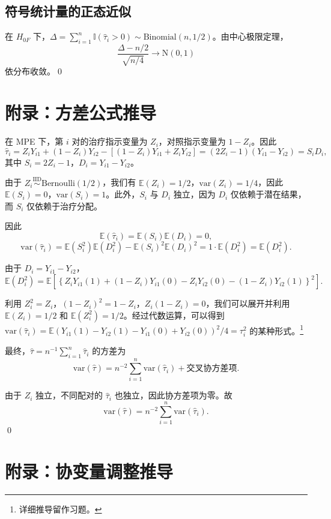\subsection{符号统计量的正态近似}\label{sec:appendix-7-sign}

在 $H_{0F}$ 下，$\Delta = \sum_{i=1}^n \mathbb{I}(\hat\tau_i > 0) \sim \text{Binomial}(n, 1/2)$。由中心极限定理，
\[
\frac{\Delta - n/2}{\sqrt{n/4}} \to \mathrm{N}(0, 1)
\]
依分布收敛。\qed

\section{附录：方差公式推导}\label{sec:appendix-7-variance}

在 MPE 下，第 $i$ 对的治疗指示变量为 $Z_i$，对照指示变量为 $1 - Z_i$。因此
\[
\hat\tau_i = Z_i Y_{i1} + (1 - Z_i) Y_{i2} - \left[(1 - Z_i) Y_{i1} + Z_i Y_{i2}\right] = (2Z_i - 1)(Y_{i1} - Y_{i2}) = S_i D_i,
\]
其中 $S_i = 2Z_i - 1$，$D_i = Y_{i1} - Y_{i2}$。

由于 $Z_i \stackrel{\text{IID}}{\sim} \text{Bernoulli}(1/2)$，我们有 $\mathbb{E}(Z_i) = 1/2$，$\text{var}(Z_i) = 1/4$，因此 $\mathbb{E}(S_i) = 0$，$\text{var}(S_i) = 1$。此外，$S_i$ 与 $D_i$ 独立，因为 $D_i$ 仅依赖于潜在结果，而 $S_i$ 仅依赖于治疗分配。

因此
\[
\mathbb{E}(\hat\tau_i) = \mathbb{E}(S_i) \mathbb{E}(D_i) = 0,
\]
\[
\text{var}(\hat\tau_i) = \mathbb{E}(S_i^2) \mathbb{E}(D_i^2) - \mathbb{E}(S_i)^2 \mathbb{E}(D_i)^2 = 1 \cdot \mathbb{E}(D_i^2) = \mathbb{E}(D_i^2).
\]

由于 $D_i = Y_{i1} - Y_{i2}$，
\[
\mathbb{E}(D_i^2) = \mathbb{E}\left[\left\{Z_i Y_{i1}(1) + (1 - Z_i) Y_{i1}(0) - Z_i Y_{i2}(0) - (1 - Z_i) Y_{i2}(1)\right\}^2\right].
\]

利用 $Z_i^2 = Z_i$，$(1 - Z_i)^2 = 1 - Z_i$，$Z_i(1 - Z_i) = 0$，我们可以展开并利用 $\mathbb{E}(Z_i) = 1/2$ 和 $\mathbb{E}(Z_i^2) = 1/2$。经过代数运算，可以得到 $\text{var}(\hat\tau_i) = \mathbb{E}(Y_{i1}(1) - Y_{i2}(1) - Y_{i1}(0) + Y_{i2}(0))^2 / 4 = \tau_i^2$ 的某种形式。\footnote{详细推导留作习题。}

最终，$\hat\tau = n^{-1} \sum_{i=1}^n \hat\tau_i$ 的方差为
\[
\text{var}(\hat\tau) = n^{-2} \sum_{i=1}^n \text{var}(\hat\tau_i) + \text{交叉协方差项}.
\]

由于 $Z_i$ 独立，不同配对的 $\hat\tau_i$ 也独立，因此协方差项为零。故
\[
\text{var}(\hat\tau) = n^{-2} \sum_{i=1}^n \text{var}(\hat\tau_i).
\]
\qed

\section{附录：协变量调整推导}\label{sec:appendix-7-covariate}

